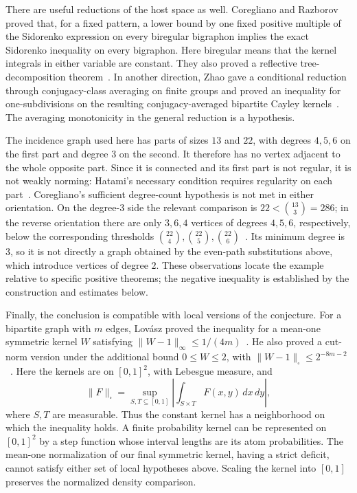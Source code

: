 There are useful reductions of the host space as well. Coregliano and
Razborov proved that, for a fixed pattern, a lower bound by one fixed
positive multiple of the Sidorenko expression on every biregular
bigraphon implies the exact Sidorenko inequality on every bigraphon.
Here biregular means that the
kernel integrals in either variable are constant. They also proved a
reflective tree-decomposition theorem~\cite{coreglianorazborov2021}.
In another direction, Zhao gave a conditional reduction through
conjugacy-class averaging on finite groups and proved an inequality
for one-subdivisions on the resulting conjugacy-averaged bipartite
Cayley kernels~\cite[Theorems~1.3--1.4]{zhao2026conjugacy}.  The averaging monotonicity in the
general reduction is a hypothesis.

The incidence graph used here has parts of sizes $13$ and $22$,
with degrees $4,5,6$ on the first part and degree $3$ on the second.
It therefore has no vertex adjacent to the whole opposite part.
Since it is connected and its first part is not regular, it is not
weakly norming: Hatami's necessary condition requires regularity on
each part~\cite{hatami2010}. Coregliano's sufficient degree-count
hypothesis is not met in either orientation.  On the degree-$3$ side the relevant comparison is
$22<\binom{13}{3}=286$; in the reverse orientation there are only
$3,6,4$ vertices of degrees $4,5,6$, respectively, below the
corresponding thresholds
$\binom{22}{4},\binom{22}{5},\binom{22}{6}$~\cite[Theorem~3.6]{coregliano2024}.
Its minimum degree is $3$, so it is not directly a graph obtained by
the even-path substitutions above, which introduce vertices of
degree $2$.  These observations locate the example relative to
specific positive theorems; the negative inequality is established by
the construction and estimates below.

Finally, the conclusion is compatible with local versions of the
conjecture.  For a bipartite graph with $m$ edges, Lov\'asz proved the
inequality for a mean-one symmetric kernel $W$ satisfying
$\lVert W-1\rVert_\infty\leq 1/(4m)$~\cite[Theorem~5.1]{lovasz2011local}.
He also proved a cut-norm
version under the additional bound $0\leq W\leq2$, with
$\lVert W-1\rVert_\square\leq2^{-8m-2}$~\cite[Theorem~4.1]{lovasz2011local}.
Here the kernels are on $[0,1]^2$, with Lebesgue measure, and
\[
 \lVert F\rVert_\square
 =\sup_{S,T\subseteq[0,1]}
   \left|\int_{S\times T}F(x,y)\,dx\,dy\right|,
\]
where $S,T$ are measurable. Thus the constant kernel has a neighborhood
on which the inequality holds. A finite probability kernel can be
represented on $[0,1]^2$ by a step function whose interval lengths
are its atom probabilities. The mean-one normalization of our final
symmetric kernel, having a strict deficit, cannot satisfy either set
of local hypotheses above. Scaling the kernel into $[0,1]$ preserves
the normalized density comparison.

